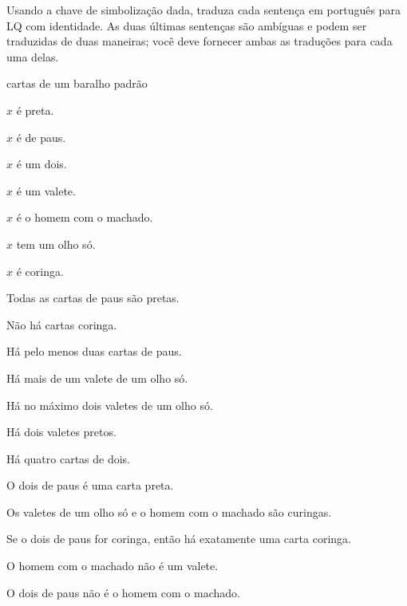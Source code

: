 \solutions
\problempart
\label{pr.QLcards}
Usando a chave de simbolização dada, traduza cada sentença em português para LQ com identidade. As duas últimas sentenças são ambíguas e podem ser traduzidas de duas maneiras; você deve fornecer ambas as traduções para cada uma delas.
\begin{ekey}
\item[UD:] cartas de um baralho padrão
\item[Bx:] $x$ é preta.
\item[Cx:] $x$ é de paus.
\item[Dx:] $x$ é um dois.
\item[Jx:] $x$ é um valete.
\item[Mx:] $x$ é o homem com o machado.
\item[Ox:] $x$ tem um olho só.
\item[Wx:] $x$ é coringa.
\end{ekey}
\begin{earg}
\item Todas as cartas de paus são pretas.
\item Não há cartas coringa.
\item Há pelo menos duas cartas de paus.
\item Há mais de um valete de um olho só.
\item Há no máximo dois valetes de um olho só.
\item Há dois valetes pretos.
\item Há quatro cartas de dois.
\item O dois de paus é uma carta preta.
\item Os valetes de um olho só e o homem com o machado são curingas.
\item Se o dois de paus for coringa, então há exatamente uma carta coringa.
\item O homem com o machado não é um valete.
\item O dois de paus não é o homem com o machado.
\end{earg}


